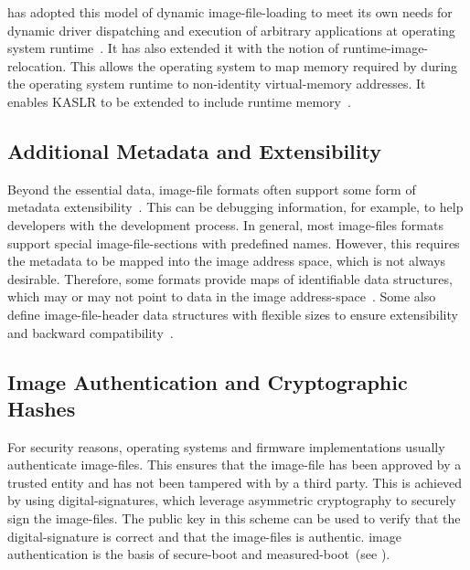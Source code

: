  has adopted this model of dynamic \gls{image-file-loading} to meet its own needs for dynamic driver dispatching and execution of arbitrary applications at operating system runtime~\cite{pi-spec,uefi-spec}. It has also extended it with the notion of \gls{runtime-image-relocation}. This allows the operating system to map memory required by  during the operating system runtime to non-identity \gls{virtual-memory} addresses. It enables \gls{KASLR} to be extended to include  runtime memory~\cite{xnu}.

\subsection{Additional Metadata and Extensibility}

Beyond the essential data, \gls{image-file} formats often support some form of metadata extensibility~\cite{elf-spec,macho-spec,pe-format}. This can be debugging information, for example, to help developers with the development process. In general, most \glspl{image-file} formats support special \glspl{image-file-section} with predefined names. However, this requires the metadata to be mapped into the \gls{image} address space, which is not always desirable. Therefore, some formats provide maps of identifiable data structures, which may or may not point to data in the \gls{image} \gls{address-space}~\cite{macho-spec,pe-format}. Some also define \gls{image-file-header} data structures with flexible sizes to ensure extensibility and backward compatibility~\cite{elf-spec}.

\subsection{Image Authentication and Cryptographic Hashes}
\label{sec:image_auth}

For security reasons, operating systems and \gls{firmware} implementations usually authenticate \glspl{image-file}. This ensures that the \gls{image-file} has been approved by a trusted entity and has not been tampered with by a third party. This is achieved by using \glspl{digital-signature}, which leverage asymmetric cryptography to securely sign the \glspl{image-file}. The public key in this scheme can be used to verify that the \gls{digital-signature} is correct and that the \glspl{image-file} is authentic. \Gls{image} authentication is the basis of  \gls{secure-boot} and \gls{measured-boot}~(see ).

